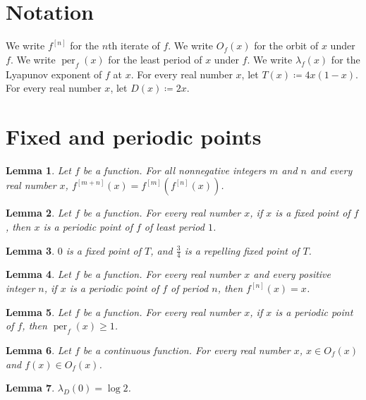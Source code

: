 \documentclass{article}
\newtheorem{lemma}{Lemma}
\begin{document}
\section{Notation}

We write $f^{[n]}$ for the $n$th iterate of $f$.
We write $O_f(x)$ for the orbit of $x$ under $f$.
We write $\operatorname{per}_f(x)$ for the least period of $x$ under $f$.
We write $\lambda_f(x)$ for the Lyapunov exponent of $f$ at $x$.
For every real number $x$, let $T(x)\coloneqq 4x(1-x)$.
For every real number $x$, let $D(x)\coloneqq 2x$.

\section{Fixed and periodic points}

\begin{lemma}\label{iterate}
Let $f$ be a function. For all nonnegative integers $m$ and $n$ and every real number $x$, $f^{[m+n]}(x)=f^{[m]}(f^{[n]}(x))$.
\end{lemma}

\begin{lemma}\label{fixed}
Let $f$ be a function. For every real number $x$, if $x$ is a fixed point of $f$, then $x$ is a periodic point of $f$ of least period $1$.
\end{lemma}

\begin{lemma}\label{attracting}
$0$ is a fixed point of $T$, and $\frac{3}{4}$ is a repelling fixed point of $T$.
\end{lemma}

\begin{lemma}\label{period}
Let $f$ be a function. For every real number $x$ and every positive integer $n$, if $x$ is a periodic point of $f$ of period $n$, then $f^{[n]}(x)=x$.
\end{lemma}

\begin{lemma}\label{least}
Let $f$ be a function. For every real number $x$, if $x$ is a periodic point of $f$, then $\operatorname{per}_f(x)\ge1$.
\end{lemma}

\begin{lemma}\label{orbit}
Let $f$ be a continuous function. For every real number $x$, $x\in O_f(x)$ and $f(x)\in O_f(x)$.
\end{lemma}

\begin{lemma}\label{lyapunov}
$\lambda_D(0)=\log 2$.
\end{lemma}
\end{document}
